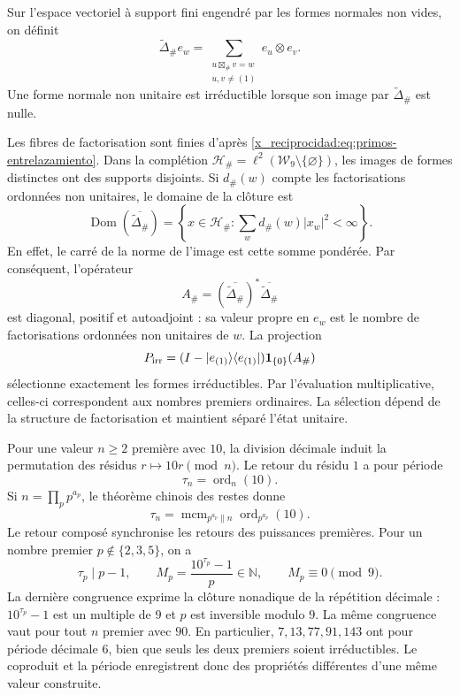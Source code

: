 \begin{definition}
Sur l'espace vectoriel à support fini engendré par les formes normales non vides, on définit
\[
 \widetilde\Delta_\# e_w
 =\sum_{\substack{u\boxtimes_\#v=w\\u,v\ne(1)}}e_u\otimes e_v.
\]
Une forme normale non unitaire est irréductible lorsque son image par
\(\widetilde\Delta_\#\) est nulle.
\end{definition}

Les fibres de factorisation sont finies d'après
\eqref{x_reciprocidad:eq:primos-entrelazamiento}. Dans la complétion
\(\mathcal H_\#=\ell^2(\mathcal W_9\setminus\{\varnothing\})\),
les images de formes distinctes ont des supports disjoints. Si
\(d_\#(w)\) compte les factorisations ordonnées non unitaires, le domaine
de la clôture est
\[
 \operatorname{Dom}(\overline{\widetilde\Delta_\#})
 =\left\{x\in\mathcal H_\#:
       \sum_w d_\#(w)|x_w|^2<\infty\right\}.
\]
En effet, le carré de la norme de l'image est cette somme pondérée. Par conséquent, l'opérateur
\[
 A_\#=(\overline{\widetilde\Delta_\#})^*
                  \overline{\widetilde\Delta_\#}
\]
est diagonal, positif et autoadjoint : sa valeur propre en \(e_w\) est le
nombre de factorisations ordonnées non unitaires de \(w\). La projection
\[
 P_{\rm irr}=(I-|e_{(1)}\rangle\langle e_{(1)}|)
                    \mathbf1_{\{0\}}(A_\#)
\]
sélectionne exactement les formes irréductibles. Par l'évaluation multiplicative, celles-ci correspondent aux nombres premiers ordinaires. La sélection dépend de la structure de factorisation et maintient séparé l'état unitaire.

Pour une valeur \(n\geq2\) première avec \(10\), la division décimale induit la
permutation des résidus \(r\mapsto10r\pmod n\). Le retour du résidu
\(1\) a pour période
\[
 \tau_n=\operatorname{ord}_n(10).
\]
Si \(n=\prod_p p^{a_p}\), le théorème chinois des restes donne
\[
 \tau_n=\operatorname{mcm}_{p^{a_p}\parallel n}
                    \operatorname{ord}_{p^{a_p}}(10).
\]
Le retour composé synchronise les retours des puissances premières.
Pour un nombre premier \(p\notin\{2,3,5\}\), on a
\[
 \tau_p\mid p-1,\qquad
 M_p=\frac{10^{\tau_p}-1}{p}\in\mathbb N,
 \qquad M_p\equiv0\pmod9.
\]
La dernière congruence exprime la clôture nonadique de la répétition décimale : \(10^{\tau_p}-1\) est un multiple de \(9\) et \(p\) est inversible modulo \(9\). La même congruence vaut pour tout \(n\) premier avec \(90\). En particulier, \(7,13,77,91,143\) ont pour période décimale \(6\), bien que seuls les deux premiers soient irréductibles. Le coproduit et la période enregistrent donc des propriétés différentes d'une même valeur construite.

